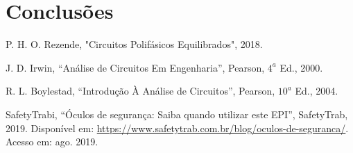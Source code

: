 \documentclass[a4paper,12pt,oneside,openany,table,xcdraw]{article}
\begin{document}
\section{Conclusões} %


\newpage
\begin{thebibliography}{9} 
    P. H. O. Rezende,
    "Circuitos Polifásicos Equilibrados", 2018.

    J. D. Irwin,
    “Análise de Circuitos Em Engenharia”, Pearson, $4^a$ Ed., 2000.

    R. L. Boylestad,
    “Introdução À Análise de Circuitos”, Pearson, $10^a$ Ed., 2004.

    SafetyTrabi,
    “Óculos de segurança: Saiba quando utilizar este EPI”, SafetyTrab, 2019.
 Disponível em:
 \url{https://www.safetytrab.com.br/blog/oculos-de-seguranca/}. Acesso em: ago. 2019.


\end{thebibliography}
\end{document}
